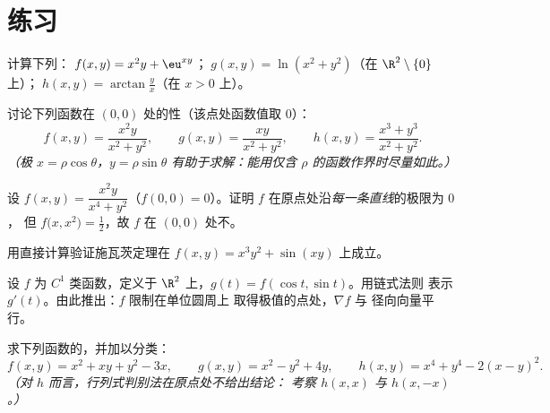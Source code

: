 \section{练习}

\begin{exercise}[$\star$]\label{exo:b1:multivar:1}
计算下列：
$f(x,y) = x^2 y + \eu^{xy}$；$\;g(x,y) = \ln(x^2 + y^2)$（在
$\R^2\setminus\{0\}$ 上）；$\;h(x,y) = \arctan\frac yx$（在 $x > 0$ 上）。
\end{exercise}

\begin{exercise}[$\star$]\label{exo:b1:multivar:2}
讨论下列函数在 $(0,0)$ 处的性（该点处函数值取 $0$）：
\[
f(x,y) = \frac{x^2 y}{x^2 + y^2},
\qquad
g(x,y) = \frac{xy}{x^2 + y^2},
\qquad
h(x,y) = \frac{x^3 + y^3}{x^2 + y^2}.
\]
\emph{（极 $x = \rho\cos\theta$，$y = \rho\sin\theta$
有助于求解：能用仅含 $\rho$ 的函数作界时尽量如此。）}
\end{exercise}

\begin{exercise}[$\star\star$]\label{exo:b1:multivar:3}
设 $f(x,y) = \dfrac{x^2 y}{x^4 + y^2}$（$f(0,0) = 0$）。证明
$f$ 在原点处沿\emph{每一条直线}的极限为 $0$，
但 $f\bigl(x, x^2\bigr) = \frac12$，故 $f$ 在
$(0,0)$ 处不。
\end{exercise}

\begin{exercise}[$\star$]\label{exo:b1:multivar:4}
用直接计算验证施瓦茨定理在 $f(x, y) = x^3 y^2 + \sin(xy)$ 上成立。
\end{exercise}

\begin{exercise}[$\star\star$]\label{exo:b1:multivar:5}
设 $f$ 为 $C^1$ 类函数，定义于 $\R^2$ 上，$g(t) = f(\cos t, \sin t)$。用链式法则
表示 $g'(t)$。由此推出：$f$ 限制在单位圆周上
取得极值的点处，$\nabla f$ 与
径向向量平行。
\end{exercise}

\begin{exercise}[$\star\star$]\label{exo:b1:multivar:6}
求下列函数的，并加以分类：
\[
f(x, y) = x^2 + xy + y^2 - 3x,
\qquad
g(x, y) = x^2 - y^2 + 4y,
\qquad
h(x, y) = x^4 + y^4 - 2(x - y)^2 .
\]
\emph{（对 $h$ 而言，行列式判别法在原点处不给出结论：
考察 $h(x, x)$ 与 $h(x, -x)$。）}
\end{exercise}

